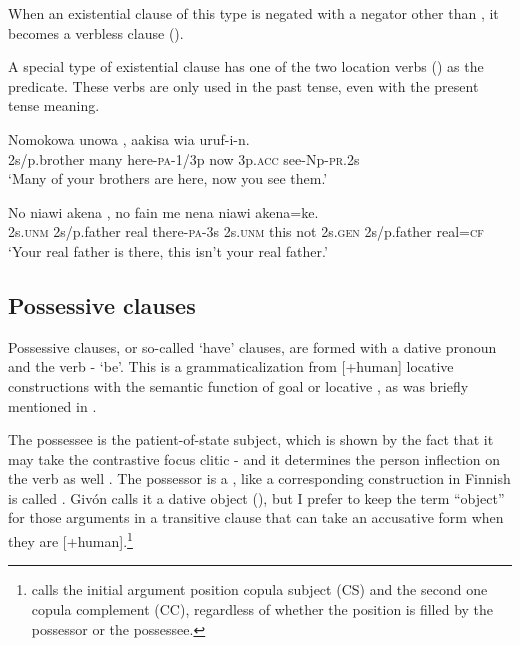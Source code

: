 When an existential clause of this type is negated with a negator other than , it becomes a verbless clause ().

A special type of existential clause has one of the two location verbs () as the predicate. These verbs are only used in the past tense, even with the present tense meaning.

\ea%
\label{ex:5:x1154}
\gll Nomokowa  unowa  ,  aakisa  wia  uruf-i-n.  \\
     2s/p.brother  many  here-\textsc{pa}-1/3p  now  3p.\textsc{acc}  see-Np-\textsc{pr}.2s \\
\glt `Many of your brothers are here, now you see them.'
\z

\ea%
\label{ex:5:x1155}
\gll No  niawi  akena  ,  no  fain me  nena  niawi  akena=ke. \\
     2s.\textsc{unm}  2s/p.father  real  there-\textsc{pa}-3s  2s.\textsc{unm}  this not  2s.\textsc{gen}  2s/p.father  real=\textsc{cf} \\
\glt `Your real father is there, this isn't your real father.'
\z

\subsection{Possessive clauses} \label{5.5.2}

Possessive clauses, or so-called `have' clauses, are formed with a dative pronoun and the verb - `be'. This is a grammaticalization from [+human] locative constructions with the semantic function of goal or locative \citep[50--61]{Heine1997}, as was briefly mentioned in .  

The possessee is the patient-of-state subject, which is shown by the fact that it may take the contrastive focus clitic -  and it determines the person inflection on the verb as well . The possessor is a , like  a corresponding construction in Finnish is called \citep[209]{HakulinenEtAl1979}%
. Giv\'on calls it a dative object (\citeyear[104]{Givon1984}), but I prefer to keep the term ``object'' for those arguments in a transitive clause that can take an accusative form when they are [+human].\footnote{\citet[302]{Dixon2010b} calls the initial argument position copula subject (CS) and the second one copula complement (CC), regardless of whether the position is filled by the possessor or the possessee.}

